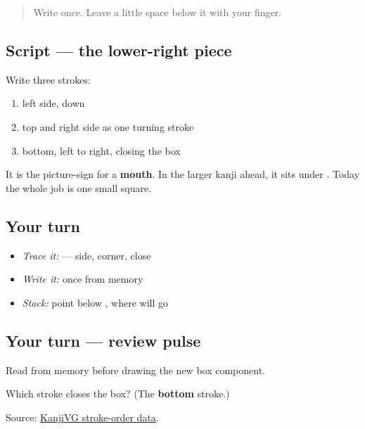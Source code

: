 \label{lesson:JA-W05-mouth-component}



\begin{quote}
Write  once. Leave a little space below it with your finger.
\end{quote}

\subsection*{Script — the lower-right piece}

\begin{quote}
\end{quote}

Write three strokes:

\begin{enumerate}
\raggedright
  \item left side, down
  \item top and right side as one turning stroke
  \item bottom, left to right, closing the box
\end{enumerate}

It is the picture-sign for a \textbf{mouth}. In the larger kanji ahead, it sits under . Today the whole job is one small square.

\subsection*{Your turn}
\begin{itemize}
\raggedright
  \item \emph{Trace it:}  — side, corner, close
  \item \emph{Write it:}  once from memory
  \item \emph{Stack:} point below , where  will go
\end{itemize}

\subsection*{Your turn — review pulse}
Read \textbf{} from memory before drawing the new box component.

\begin{tcolorbox}[breakable,colback=teal!4,colframe=teal!35!black,title={Before you move on}]
Which stroke closes the box? (The \textbf{bottom} stroke.)

Source: \href{https://kanjivg.tagaini.net/kanjivg/kanji/053e3.html}{KanjiVG stroke-order data}.
\end{tcolorbox}
